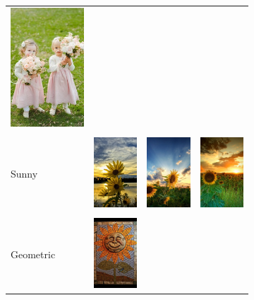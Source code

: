 \begin{figure}
\begin{subfigure}[t]{0.48\linewidth}
\begin{tabular}{m{.05in}|m{\dgap} m{\dgap} m{\dgap}}
    \includegraphics[width=.8in]{../style/figures/flickr_on_pinterest/flower/pred_style_Romantic/h/3.jpg} \\ \\
    \begin{turn}{90}\small{Sunny}\end{turn} &
    \includegraphics[width=.8in]{../style/figures/flickr_on_pinterest/flower/pred_style_Sunny/h/0.jpg} &
    \includegraphics[width=.8in]{../style/figures/flickr_on_pinterest/flower/pred_style_Sunny/h/1.jpg} &
    \includegraphics[width=.8in]{../style/figures/flickr_on_pinterest/flower/pred_style_Sunny/h/2.jpg} \\ \\
    \begin{turn}{90}\small{Geometric}\end{turn} &
    \includegraphics[width=.8in]{../style/figures/flickr_on_pinterest/flower/pred_style_Geometric_Composition/h/0.jpg} &

\end{tabular}
\end{subfigure}
\end{figure}
